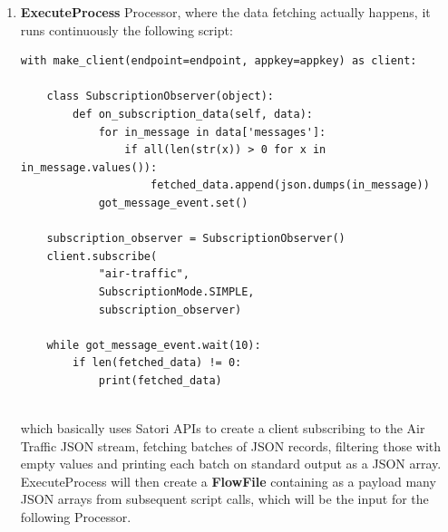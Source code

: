 \begin{enumerate}
    \item \textbf{ExecuteProcess} Processor, where the data fetching actually happens, it runs continuously the following script:
    
    \begin{code}
        \begin{verbatim}
with make_client(endpoint=endpoint, appkey=appkey) as client:
    
    class SubscriptionObserver(object):
        def on_subscription_data(self, data):
            for in_message in data['messages']:
                if all(len(str(x)) > 0 for x in in_message.values()):
                    fetched_data.append(json.dumps(in_message))
            got_message_event.set()
            
    subscription_observer = SubscriptionObserver()
    client.subscribe(
            "air-traffic",
            SubscriptionMode.SIMPLE,
            subscription_observer)
    
    while got_message_event.wait(10):
        if len(fetched_data) != 0:
            print(fetched_data)
     
        \end{verbatim}
    \end{code}
which basically uses Satori APIs to create a client subscribing to the Air Traffic JSON stream, fetching batches of JSON records, filtering those with empty values and printing each batch on standard output as a JSON array. ExecuteProcess will then create a \textbf{FlowFile} containing as a payload many JSON arrays from subsequent script calls, which will be the input for the following Processor.


\end{enumerate}
